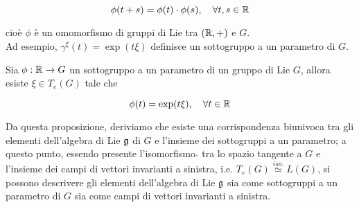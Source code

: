 \begin{equation}
	\phi(t+s) = \phi(t) \cdot \phi(s) \qcomma \forall t,s \in \R
\end{equation}

cioè $ \phi $ è un omomorfismo di gruppi di Lie tra $ (\mathbb{R},+) $ e $ G $.\\
Ad esempio, $ \gamma^{\xi}(t) = \exp(t \xi) $ definisce un sottogruppo a un parametro di $ G $.

\begin{definition}
	Sia $ \phi : \mathbb{R} \to G $ un sottogruppo a un parametro di un gruppo di Lie $ G $, allora esiste $ \xi \in T_{e}(G) $ tale che
	
	\begin{equation}
		\phi(t) = \exp (t \xi) \qcomma \forall t \in \R
	\end{equation}
\end{definition}

\begin{remark}
	Da questa proposizione, deriviamo che esiste una corrispondenza biunivoca tra gli elementi dell'algebra di Lie $ \mathfrak{g} $ di $ G $ e l'insieme dei sottogruppi a un parametro; a questo punto, essendo presente l'isomorfismo $ \hat{} $ tra lo spazio tangente a $ G $ e l'insieme dei campi di vettori invarianti a sinistra, i.e. $ T_{e}(G) \stackrel{iso.}{\simeq} L(G) $, si possono descrivere gli elementi dell'algebra di Lie $ \mathfrak{g} $ sia come sottogruppi a un parametro di $ G $ sia come campi di vettori invarianti a sinistra.
\end{remark}

